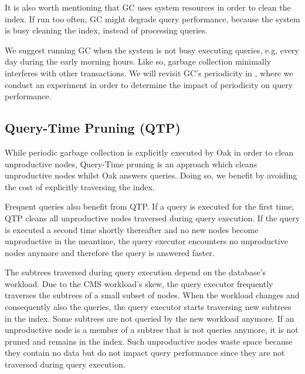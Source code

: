 \documentclass[abstracton,12pt]{scrartcl}
\theoremstyle{definition}
\begin{document}
It is also worth mentioning that GC uses system resources in order to clean the
index. If run too often, GC might degrade query performance, because the system
is busy cleaning the index, instead of processing queries.

We suggest running GC when the system is not busy executing queries, e.g, every
day during the 
early morning hours. Like so, garbage collection minimally interferes with other
transactions. We will revisit GC's periodicity in , where we
conduct an experiment in order to determine the impact of periodicity on
query performance. 


\subsection{Query-Time Pruning (QTP)}

While periodic garbage collection is explicitly executed by Oak in order to
clean unproductive nodes, Query-Time pruning is an approach which cleans
unproductive nodes whilst Oak answers queries. Doing so, we benefit by
avoiding the cost of explicitly traversing the index.  

Frequent queries also benefit from QTP. If a query is executed for the first
time, QTP cleans all unproductive nodes traversed during query execution.
If the query is executed a second time shortly thereafter and  no new nodes
become unproductive in the meantime, the query executor encounters no
unproductive nodes anymore and therefore the query is answered faster.

The subtrees traversed during query execution depend on the database's workload.
Due to the CMS workload's skew, the query executor frequently traverses the
subtrees of a small subset of nodes. When the workload changes and consequently
also the queries, the query executor starts traversing new subtrees in the index.
Some subtrees are not queried by the new workload anymore. If an unproductive
node is a member of a subtree that is not queries anymore, it is not pruned and
remains in the index.
Such unproductive nodes waste space because they contain no data but do not
impact query performance since they are not traversed during query execution.

\end{document}
